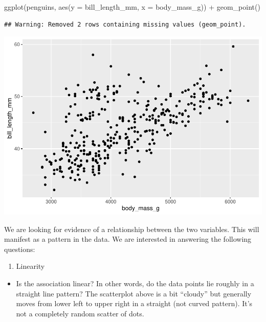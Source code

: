 \documentclass[
]{book}
\newenvironment{Shaded}{\begin{snugshade}}{\end{snugshade}}
\newcommand{\AttributeTok}[1]{\textcolor[rgb]{0.77,0.63,0.00}{#1}}
\newcommand{\FunctionTok}[1]{\textcolor[rgb]{0.00,0.00,0.00}{#1}}
\newcommand{\NormalTok}[1]{#1}
\newcommand{\SpecialCharTok}[1]{\textcolor[rgb]{0.00,0.00,0.00}{#1}}
\providecommand{\tightlist}{%
  \setlength{\itemsep}{0pt}\setlength{\parskip}{0pt}}
\begin{document}
\begin{Shaded}
\begin{Highlighting}[]
\FunctionTok{ggplot}\NormalTok{(penguins, }\FunctionTok{aes}\NormalTok{(}\AttributeTok{y =}\NormalTok{ bill\_length\_mm, }\AttributeTok{x =}\NormalTok{ body\_mass\_g)) }\SpecialCharTok{+}
    \FunctionTok{geom\_point}\NormalTok{()}
\end{Highlighting}
\end{Shaded}

\begin{verbatim}
## Warning: Removed 2 rows containing missing values (geom_point).
\end{verbatim}

\includegraphics{intro_stats_files/figure-latex/unnamed-chunk-105-1.pdf}

We are looking for evidence of a relationship between the two variables. This will manifest as a pattern in the data. We are interested in answering the following questions:

\begin{enumerate}
\def\labelenumi{\arabic{enumi}.}
\tightlist
\item
  Linearity
\end{enumerate}

\begin{itemize}
\tightlist
\item
  Is the association linear? In other words, do the data points lie roughly in a straight line pattern? The scatterplot above is a bit ``cloudy'' but generally moves from lower left to upper right in a straight (not curved pattern). It's not a completely random scatter of dots.
\end{itemize}
\end{document}
